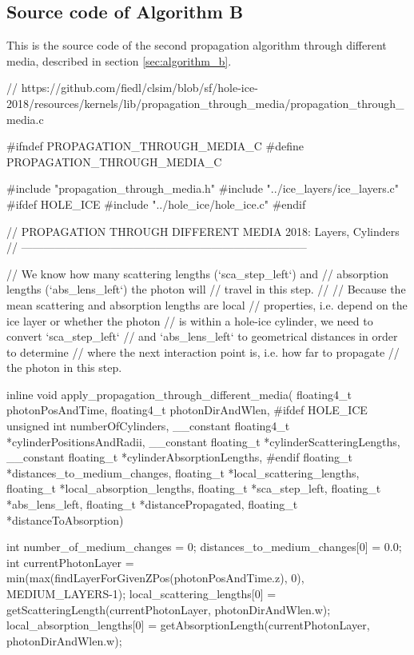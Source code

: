
\subsection{Source code of Algorithm B}
\label{sec:algorithm_b_source}

This is the source code of the second propagation algorithm through different media, described in section \ref{sec:algorithm_b}.


\begin{ccode}
// https://github.com/fiedl/clsim/blob/sf/hole-ice-2018/resources/kernels/lib/propagation_through_media/propagation_through_media.c

#ifndef PROPAGATION_THROUGH_MEDIA_C
#define PROPAGATION_THROUGH_MEDIA_C

#include "propagation_through_media.h"
#include "../ice_layers/ice_layers.c"
#ifdef HOLE_ICE
  #include "../hole_ice/hole_ice.c"
#endif


// PROPAGATION THROUGH DIFFERENT MEDIA 2018: Layers, Cylinders
// -----------------------------------------------------------------------------

// We know how many scattering lengths (`sca_step_left`) and
// absorption lengths (`abs_lens_left`) the photon will
// travel in this step.
//
// Because the mean scattering and absorption lengths are local
// properties, i.e. depend on the ice layer or whether the photon
// is within a hole-ice cylinder, we need to convert `sca_step_left`
// and `abs_lens_left` to geometrical distances in order to determine
// where the next interaction point is, i.e. how far to propagate
// the photon in this step.

inline void apply_propagation_through_different_media(
  floating4_t photonPosAndTime, floating4_t photonDirAndWlen,
  #ifdef HOLE_ICE
    unsigned int numberOfCylinders, __constant floating4_t *cylinderPositionsAndRadii,
    __constant floating_t *cylinderScatteringLengths, __constant floating_t *cylinderAbsorptionLengths,
  #endif
  floating_t *distances_to_medium_changes, floating_t *local_scattering_lengths, floating_t *local_absorption_lengths,
  floating_t *sca_step_left, floating_t *abs_lens_left,
  floating_t *distancePropagated, floating_t *distanceToAbsorption)
{

  int number_of_medium_changes = 0;
  distances_to_medium_changes[0] = 0.0;
  int currentPhotonLayer = min(max(findLayerForGivenZPos(photonPosAndTime.z), 0), MEDIUM_LAYERS-1);
  local_scattering_lengths[0] = getScatteringLength(currentPhotonLayer, photonDirAndWlen.w);
  local_absorption_lengths[0] = getAbsorptionLength(currentPhotonLayer, photonDirAndWlen.w);

}
\end{ccode}
